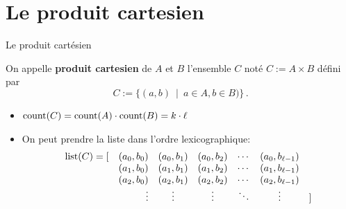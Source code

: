 \documentclass{beamer}
\begin{document}
\section{Le produit cartesien}
\begin{frame}{Le produit cartésien}

  \begin{definition}
    On appelle \textbf{produit cartesien} de $A$ et $B$ l'ensemble $C$ noté 
    $C:=A\times B$ défini par
    $$C := \{(a,b)\ \mid\ a\in A, b\in B)\}\,.$$
  \end{definition}
  \pause\bigskip

  \begin{itemize}
  \item $\operatorname{count}(C) = \operatorname{count}(A)\cdot\operatorname{count}(B) = k\cdot\ell$
  \item On peut prendre la liste dans l'ordre lexicographique:
    \[\begin{array}{rrccccl}
      \operatorname{list}(C) = [&(a_0, b_0)& (a_0, b_1)& (a_0, b_2)&\cdots&(a_0, b_{\ell-1})&\\
                  &(a_1, b_0)& (a_1, b_1)& (a_1, b_2)&\cdots&(a_1, b_{\ell-1})&\\
                  &(a_2, b_0)& (a_2, b_1)& (a_2, b_2)&\cdots&(a_2, b_{\ell-1})&\\
                  &\vdots&\vdots& \vdots  &\ddots&   \vdots&]\\
    \end{array}\]
  \end{itemize}
\end{frame}
\end{document}
